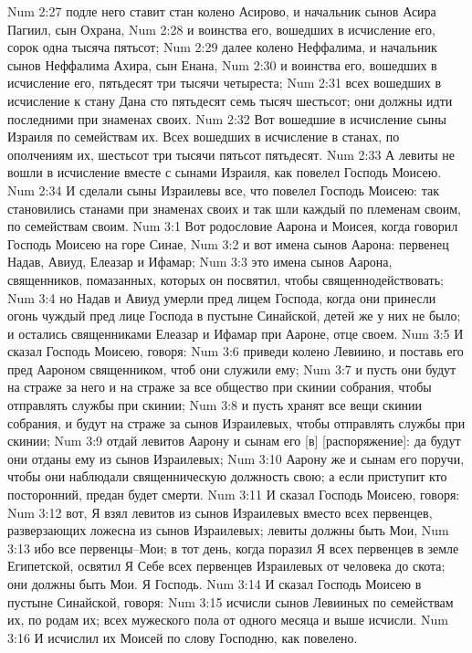 Num 2:27  подле него ставит стан колено Асирово, и начальник сынов Асира Пагиил, сын Охрана,
Num 2:28  и воинства его, вошедших в исчисление его, сорок одна тысяча пятьсот;
Num 2:29  далее колено Неффалима, и начальник сынов Неффалима Ахира, сын Енана,
Num 2:30  и воинства его, вошедших в исчисление его, пятьдесят три тысячи четыреста;
Num 2:31  всех вошедших в исчисление к стану Дана сто пятьдесят семь тысяч шестьсот; они должны идти последними при знаменах своих.
Num 2:32  Вот вошедшие в исчисление сыны Израиля по семействам их. Всех вошедших в исчисление в станах, по ополчениям их, шестьсот три тысячи пятьсот пятьдесят.
Num 2:33  А левиты не вошли в исчисление вместе с сынами Израиля, как повелел Господь Моисею.
Num 2:34  И сделали сыны Израилевы все, что повелел Господь Моисею: так становились станами при знаменах своих и так шли каждый по племенам своим, по семействам своим.
Num 3:1  Вот родословие Аарона и Моисея, когда говорил Господь Моисею на горе Синае,
Num 3:2  и вот имена сынов Аарона: первенец Надав, Авиуд, Елеазар и Ифамар;
Num 3:3  это имена сынов Аарона, священников, помазанных, которых он посвятил, чтобы священнодействовать;
Num 3:4  но Надав и Авиуд умерли пред лицем Господа, когда они принесли огонь чуждый пред лице Господа в пустыне Синайской, детей же у них не было; и остались священниками Елеазар и Ифамар при Аароне, отце своем.
Num 3:5  И сказал Господь Моисею, говоря:
Num 3:6  приведи колено Левиино, и поставь его пред Аароном священником, чтоб они служили ему;
Num 3:7  и пусть они будут на страже за него и на страже за все общество при скинии собрания, чтобы отправлять службы при скинии;
Num 3:8  и пусть хранят все вещи скинии собрания, и будут на страже за сынов Израилевых, чтобы отправлять службы при скинии;
Num 3:9  отдай левитов Аарону и сынам его [в] [распоряжение]: да будут они отданы ему из сынов Израилевых;
Num 3:10  Аарону же и сынам его поручи, чтобы они наблюдали священническую должность свою; а если приступит кто посторонний, предан будет смерти.
Num 3:11  И сказал Господь Моисею, говоря:
Num 3:12  вот, Я взял левитов из сынов Израилевых вместо всех первенцев, разверзающих ложесна из сынов Израилевых; левиты должны быть Мои,
Num 3:13  ибо все первенцы--Мои; в тот день, когда поразил Я всех первенцев в земле Египетской, освятил Я Себе всех первенцев Израилевых от человека до скота; они должны быть Мои. Я Господь.
Num 3:14  И сказал Господь Моисею в пустыне Синайской, говоря:
Num 3:15  исчисли сынов Левииных по семействам их, по родам их; всех мужеского пола от одного месяца и выше исчисли.
Num 3:16  И исчислил их Моисей по слову Господню, как повелено.
